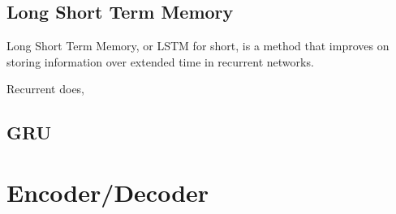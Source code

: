 \subsection{Long Short Term Memory}
Long Short Term Memory, or LSTM for short, is a method that improves on storing information over extended time in recurrent networks. 

Recurrent does, 

\cite{hochreiter1997long}

\subsection{GRU}


\section{Encoder/Decoder}

\cite{rocktaschel2015reasoning}
\fi